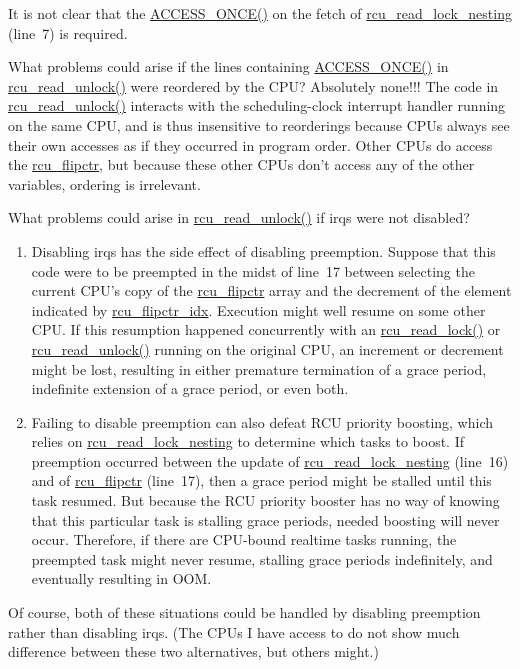 	It is not clear that the \url{ACCESS_ONCE()} on the
	fetch of \url{rcu_read_lock_nesting} (line~7) is required.

\QuickQ{}
	What problems could arise if the lines containing
	\url{ACCESS_ONCE()} in \url{rcu_read_unlock()}
	were reordered by the CPU?
\QuickA{}
	Absolutely none!!!  The code in \url{rcu_read_unlock()}
	interacts with the scheduling-clock interrupt handler
	running on the same CPU, and is thus insensitive to reorderings
	because CPUs always see their own accesses as if they occurred
	in program order.
	Other CPUs do access the \url{rcu_flipctr}, but because these
	other CPUs don't access any of the other variables, ordering is
	irrelevant.

\QuickQ{}
	What problems could arise in
	\url{rcu_read_unlock()} if irqs were not disabled?
\QuickA{}
	\begin{enumerate}
	\item	Disabling irqs has the side effect of disabling preemption.
		Suppose that this code were to be preempted in the midst
		of line~17 between selecting the current CPU's copy
		of the \url{rcu_flipctr} array and the decrement of
		the element indicated by \url{rcu_flipctr_idx}.
		Execution might well resume on some other CPU.
		If this resumption happened concurrently with an
		\url{rcu_read_lock()} or \url{rcu_read_unlock()}
		running on the original CPU,
		an increment or decrement might be lost, resulting in either
		premature termination of a grace period, indefinite extension
		of a grace period, or even both.
	\item	Failing to disable preemption can also defeat RCU priority
		boosting, which relies on \url{rcu_read_lock_nesting}
		to determine which tasks to boost.
		If preemption occurred between the update of
		\url{rcu_read_lock_nesting} (line~16) and of
		\url{rcu_flipctr} (line~17), then a grace
		period might be stalled until this task resumed.
		But because the RCU priority booster has no way of knowing
		that this particular task is stalling grace periods, needed
		boosting will never occur.
		Therefore, if there are CPU-bound realtime tasks running,
		the preempted task might never resume, stalling grace periods
		indefinitely, and eventually resulting in OOM.
	\end{enumerate}

	Of course, both of these situations could be handled by disabling
	preemption rather than disabling irqs.
	(The CPUs I have access to do not show much difference between these
	two alternatives, but others might.)

